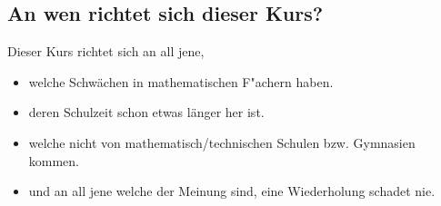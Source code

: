 \subsection{An wen richtet sich dieser Kurs?}
Dieser Kurs richtet sich an all jene,
\begin{itemize}
\item welche Schwächen in mathematischen F"achern haben.
\item deren Schulzeit schon etwas länger her ist.
\item welche nicht von mathematisch/technischen Schulen bzw. Gymnasien kommen.
\item und an all jene welche der Meinung sind, eine Wiederholung schadet nie.
\end{itemize}